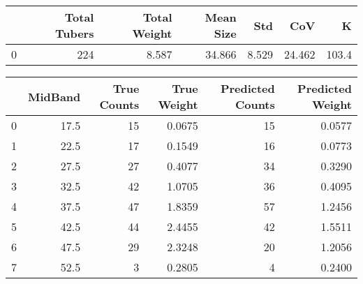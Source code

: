 \begin{tabular}{lrrrrrr}
\toprule
{} &  Total Tubers &  Total Weight &  Mean Size &    Std &     CoV &      K \\
\midrule
0 &           224 &         8.587 &     34.866 &  8.529 &  24.462 &  103.4 \\
\bottomrule
\end{tabular}

\begin{tabular}{lrrrrr}
\toprule
{} &  MidBand &  True Counts &  True Weight &  Predicted Counts &  Predicted Weight \\
\midrule
0 &     17.5 &           15 &       0.0675 &                15 &            0.0577 \\
1 &     22.5 &           17 &       0.1549 &                16 &            0.0773 \\
2 &     27.5 &           27 &       0.4077 &                34 &            0.3290 \\
3 &     32.5 &           42 &       1.0705 &                36 &            0.4095 \\
4 &     37.5 &           47 &       1.8359 &                57 &            1.2456 \\
5 &     42.5 &           44 &       2.4455 &                42 &            1.5511 \\
6 &     47.5 &           29 &       2.3248 &                20 &            1.2056 \\
7 &     52.5 &            3 &       0.2805 &                 4 &            0.2400 \\
\bottomrule
\end{tabular}
